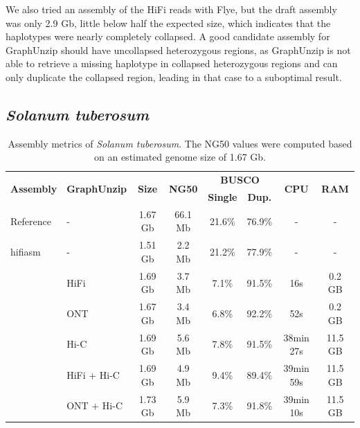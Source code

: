 We also tried an assembly of the HiFi reads with Flye, but the draft assembly was only 2.9 Gb, little below half the expected size, which indicates that the haplotypes were nearly completely collapsed. A good candidate assembly for GraphUnzip should have uncollapsed heterozygous regions, as GraphUnzip is not able to retrieve a missing haplotype in collapsed heterozygous regions and can only duplicate the collapsed region, leading in that case to a suboptimal result. \\

\subsection{\textit{Solanum tuberosum}}

\begin{table}[ht]
    \begin{center}
    \caption{\label{tab:solanum_tuberosum_assemblies}Assembly metrics of \textit{Solanum tuberosum}. The NG50 values were computed based on an estimated genome size of 1.67 Gb.}
    \begin{tabular}{llcccccc}
        \hline
        \multirow{2}{*}{\textbf{Assembly}} & \multirow{2}{*}{\textbf{GraphUnzip}} & \multirow{2}{*}{\textbf{Size}} & \multirow{2}{*}{\textbf{NG50}} &  \multicolumn{2}{c}{\textbf{BUSCO}} & \multirow{2}{*}{\textbf{CPU}} & \multirow{2}{*}{\textbf{RAM}} \\
        & & & & \textbf{Single} & \textbf{Dup.} & & \\
        \hline
        Reference & - & 1.67 Gb & 66.1 Mb & 21.6\% & 76.9\% & - & - \\
        \hline
        hifiasm & - & 1.51 Gb & 2.2 Mb & 21.2\% & 77.9\% & - & - \\
            & HiFi & 1.69 Gb & 3.7 Mb & 7.1\% & 91.5\% & 16s & 0.2 GB \\
            & ONT & 1.67 Gb & 3.4 Mb & 6.8\% & 92.2\% & 52s & 0.2 GB \\
            & Hi-C & 1.69 Gb & 5.6 Mb & 7.8\% & 91.5\% & 38min 27s & 11.5 GB\\
            & HiFi + Hi-C & 1.69 Gb & 4.9 Mb & 9.4\% & 89.4\% & 39min 59s & 11.5 GB \\
            & ONT + Hi-C & 1.73 Gb & 5.9 Mb & 7.3\% & 91.8\% & 39min 10s & 11.5 GB \\
        \hline
        \end{tabular}
  \end{center}
\end{table}

